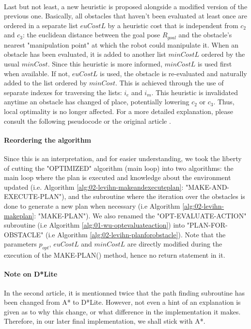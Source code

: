 \paragraph{} Last but not least, a new heuristic is proposed alongside a modified version of the previous one. Basically, all obstacles that haven't been evaluated at least once are ordered in a separate list $euCostL$ by a heuristic cost that is independent from $c_{2}$ and $c_{3}$: the euclidean distance between the goal pose $R_{goal}$ and the obstacle's nearest "manipulation point" at which the robot could manipulate it. When an obstacle has been evaluated, it is added to another list $minCostL$ ordered by the usual $minCost$. Since this heuristic is more informed, $minCostL$ is used first when available. If not, $euCostL$ is used, the obstacle is re-evaluated and naturally added to the list ordered by $minCost$. This is achieved through the use of separate indexes for traversing the lists: $i_{e}$ and $i_{m}$. This heuristic is invalidated anytime an obstacle has changed of place, potentially lowering $c_{2}$ or $c_{3}$. Thus, local optimality is no longer affected. For a more detailed explanation, please consult the following pseudocode or the original article \parencite{levihn_locally_2014}.

\paragraph{Reordering the algorithm} Since this is an interpretation, and for easier understanding, we took the liberty of cutting the "OPTIMIZED" algorithm (main loop) into two algorithms: the main loop where the plan is executed and knowledge about the environment updated (i.e. Algorithm \ref{alg:02-levihn-makeandexecuteplan}: "MAKE-AND-EXECUTE-PLAN"), and the subroutine where the iteration over the obstacles is done to generate a new plan when necessary (i.e Algorithm \ref{alg:02-levihn-makeplan}: "MAKE-PLAN"). We also renamed the "OPT-EVALUATE-ACTION" subroutine (i.e Algorithm \ref{alg:01-wu-optevaluateaction}) into "PLAN-FOR-OBSTACLE" (i.e Algorithm \ref{alg:02-levihn-planforobstacle}). Note that the parameters $p_{opt}$, $euCostL$ and $minCostL$ are directly modified during the execution of the MAKE-PLAN() method, hence no return statement in it.

\paragraph{Note on D*Lite}\label{d_star_note} In the second article, it is mentionned twice that the path finding subroutine has been changed from A* to D*Lite. However, not even a hint of an explanation is given as to why this change, or what difference in the implementation it makes. Therefore, in our later final implementation, we shall stick with A*.

